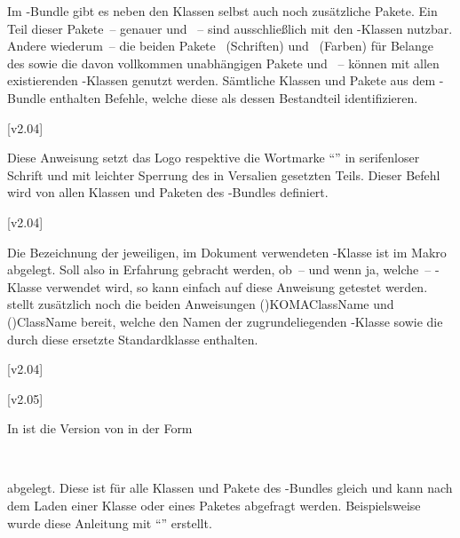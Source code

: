 \begin{Entity}{}
Im \TUDScript-Bundle gibt es neben den Klassen selbst auch noch zusätzliche 
Pakete. Ein Teil dieser Pakete~-- genauer  und 
~-- sind ausschließlich mit den \TUDScript-Klassen nutzbar.
Andere wiederum~-- die beiden Pakete ~(Schriften) und 
~(Farben) für Belange des \CDs sowie die davon vollkommen 
unabhängigen Pakete  und ~-- können mit 
allen existierenden -Klassen genutzt werden. Sämtliche 
Klassen und Pakete aus dem \TUDScript-Bundle enthalten Befehle, welche diese 
als dessen Bestandteil identifizieren.

\begin{Declaration}
  {}
  [v2.04]
\printdeclarationlist

Diese Anweisung setzt das Logo respektive die Wortmarke \enquote{\TUDScript{}} 
in serifenloser Schrift und mit leichter Sperrung des in Versalien gesetzten 
Teils. Dieser Befehl wird von allen Klassen und Paketen des \TUDScript-Bundles 
definiert.
\end{Declaration}

\begin{Declaration}
  {}
  [v2.04]
\printdeclarationlist

Die Bezeichnung der jeweiligen, im Dokument verwendeten \TUDScript-Klasse ist 
im Makro  abgelegt. Soll also in Erfahrung gebracht 
werden, ob~-- und wenn ja, welche~-- \TUDScript-Klasse verwendet wird, so kann 
einfach auf diese Anweisung getestet werden. \KOMAScript stellt zusätzlich 
noch die beiden Anweisungen \Macro*(){KOMAClassName} und 
\Macro*(){ClassName}
bereit, welche den Namen der zugrundeliegenden \KOMAScript-Klasse sowie die 
durch diese ersetzte Standardklasse enthalten.
\end{Declaration}

\begin{Declaration}
  {}
  [v2.04]
\begin{Declaration}
  {}
  [v2.05]
\printdeclarationlist

In  ist die Version von \TUDScript in der Form
\begin{quoting}
~~
\end{quoting}
abgelegt. Diese ist für alle Klassen und Pakete des \TUDScript-Bundles gleich 
und kann nach dem Laden einer Klasse oder eines Paketes abgefragt werden. 
Beispielsweise wurde diese Anleitung mit \enquote{\TUDScriptVersion} erstellt.


\end{Declaration}
\end{Declaration}
\end{Entity}
